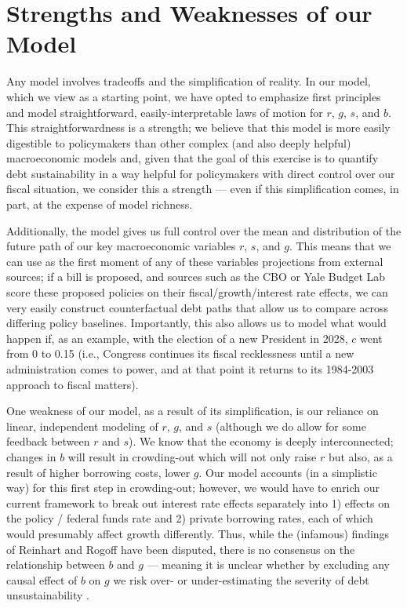 \documentclass[12pt]{article}
\begin{document}
\section{Strengths and Weaknesses of our Model}

Any model involves tradeoffs and the simplification of reality. In our model, which we view as a starting point, we have opted to emphasize first principles and model straightforward, easily-interpretable laws of motion for $r$, $g$, $s$, and $b$. This straightforwardness is a strength; we believe that this model is more easily digestible to policymakers than other complex (and also deeply helpful) macroeconomic models and, given that the goal of this exercise is to quantify debt sustainability in a way helpful for policymakers with direct control over our fiscal situation, we consider this a strength --- even if this simplification comes, in part, at the expense of model richness.

Additionally, the model gives us full control over the mean and distribution of the future path of our key macroeconomic variables $r$, $s$, and $g$. This means that we can use as the first moment of any of these variables projections from external sources; if a bill is proposed, and sources such as the CBO or Yale Budget Lab score these proposed policies on their fiscal/growth/interest rate effects, we can very easily construct counterfactual debt paths that allow us to compare across differing policy baselines. Importantly, this also allows us to model what would happen if, as an example, with the election of a new President in 2028, $c$ went from 0 to 0.15 (i.e., Congress continues its fiscal recklessness until a new administration comes to power, and at that point it returns to its 1984-2003 approach to fiscal matters).

One weakness of our model, as a result of its simplification, is our reliance on linear, independent modeling of $r$, $g$, and $s$ (although we do allow for some feedback between $r$ and $s$). We know that the economy is deeply interconnected; changes in $b$ will result in crowding-out which will not only raise $r$ but also, as a result of higher borrowing costs, lower $g$. Our model accounts (in a simplistic way) for this first step in crowding-out; however, we would have to enrich our current framework to break out interest rate effects separately into 1) effects on the policy / federal funds rate and 2) private borrowing rates, each of which would presumably affect growth differently. Thus, while the (infamous) findings of Reinhart and Rogoff have been disputed, there is no consensus on the relationship between $b$ and $g$ --- meaning it is unclear whether by excluding any causal effect of $b$ on $g$ we risk over- or under-estimating the severity of debt unsustainability \parencite{rahman2019does}.
\end{document}
